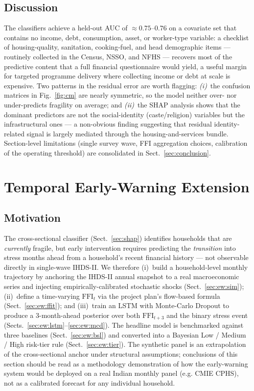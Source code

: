 \documentclass[colorlinks,balance]{asmeconf}
\begin{document}
\subsection{Discussion}
The classifiers achieve a held-out AUC of $\approx\!0.75$--$0.76$ on a covariate set that contains no income, debt, consumption, asset, or worker-type variable: a checklist of housing-quality, sanitation, cooking-fuel, and head demographic items --- routinely collected in the Census, NSSO, and NFHS --- recovers most of the predictive content that a full financial questionnaire would yield, a useful margin for targeted programme delivery where collecting income or debt at scale is expensive. Two patterns in the residual error are worth flagging: \textit{(i)}~the confusion matrices in Fig.~\ref{fig:cm} are nearly symmetric, so the model neither over- nor under-predicts fragility on average; and \textit{(ii)}~the SHAP analysis shows that the dominant predictors are not the social-identity (caste/religion) variables but the infrastructural ones --- a non-obvious finding suggesting that residual identity-related signal is largely mediated through the housing-and-services bundle. Section-level limitations (single survey wave, FFI aggregation choices, calibration of the operating threshold) are consolidated in Sect.~\ref{sec:conclusion}.

\section{Temporal Early-Warning Extension}\label{sec:ew}

\subsection{Motivation}\label{sec:ew:motiv}
The cross-sectional classifier (Sect.~\ref{sec:shap}) identifies households that are \emph{currently} fragile, but early intervention requires predicting the \emph{transition} into stress months ahead from a household's recent financial history --- not observable directly in single-wave IHDS-II. We therefore (i)~build a household-level monthly trajectory by anchoring the IHDS-II annual snapshot to a real macroeconomic series and injecting empirically-calibrated stochastic shocks (Sect.~\ref{sec:ew:sim}); (ii)~define a time-varying $\mathrm{FFI}_t$ via the project plan's flow-based formula (Sect.~\ref{sec:ew:ffit}); and (iii)~train an LSTM with Monte-Carlo Dropout to produce a 3-month-ahead posterior over both $\mathrm{FFI}_{t+3}$ and the binary stress event (Sects.~\ref{sec:ew:lstm}--\ref{sec:ew:mcd}). The headline model is benchmarked against three baselines (Sect.~\ref{sec:ew:bsl}) and converted into a Bayesian Low / Medium / High risk-tier rule (Sect.~\ref{sec:ew:tier}). The synthetic panel is an extrapolation of the cross-sectional anchor under structural assumptions; conclusions of this section should be read as a methodology demonstration of how the early-warning system would be deployed on a real Indian monthly panel (e.g. CMIE CPHS), not as a calibrated forecast for any individual household.
\end{document}
